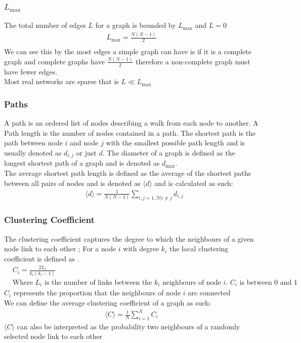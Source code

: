 \documentclass{article}
\begin{document}
        \subsubsection{$L_{\text{max}}$}
            The total number of edges $L$ for a graph is bounded by $L_{\text{max}}$ and $L=0$
            \begin{align*}
                L_{\text{max}} =  \frac{N(N-1)}{2}\\
            \end{align*}
            We can see this by the most edges a simple graph can have is if it is a complete graph and complete graphs have $\frac{N(N-1)}{2}$ therefore a non-complete graph must have fewer edges.\\
            Most real networks are sparse that is $L\ll L_{\text{max}}$\\
        \subsubsection{Paths}
        A path is an ordered list of nodes describing a walk from each node to another. A Path length is the number of nodes contained in a path. The shortest path is the path between node $i$ and node $j$ with the smallest possible path length and is usually denoted as $d_{i,j}$ or just $d$. The diameter of a graph is defined as the longest shortest path of a graph and is denoted as $d_{\text{max}}$.\\
        The average shortest path length is defined as the average of the shortest paths between all pairs of nodes and is denoted as $\langle d \rangle$ and is calculated as such:
        \begin{align*}
            &\langle d \rangle = \frac{1}{N(N-1)}\sum_{i,j=1,N | i\neq j}d_{i,j}
        \end{align*}

        \subsubsection{Clustering Coefficient}
            The clustering coefficient captures the degree to which the neighbours of a given node link to each other \parencite{barabasi2013network}; For a node $i$ with degree $k_{i}$ the local clustering coefficient is defined as \parencite{Watts1998}.
            \begin{align*}
                &C_{i} = \frac{2L_{i}}{k_{i}(k_{i}-1)}\\
                &\text{Where $L_{i}$ is the number of links between the $k_i$ neighbours of node $i$. $C_{i}$ is between $0$ and $1$}
            \end{align*}
            $C_i$ represents the proportion that the neighbours of node $i$ are connected\\
            We can define the average clustering coefficient of a graph as such:
            \begin{align*}
                \langle C \rangle = \frac{1}{N}\sum_{i=1}^{N}C_{i}
            \end{align*}
            $\langle C \rangle$ can also be interpreted as the probability two neighbours of a randomly selected node link to each other
\end{document}
